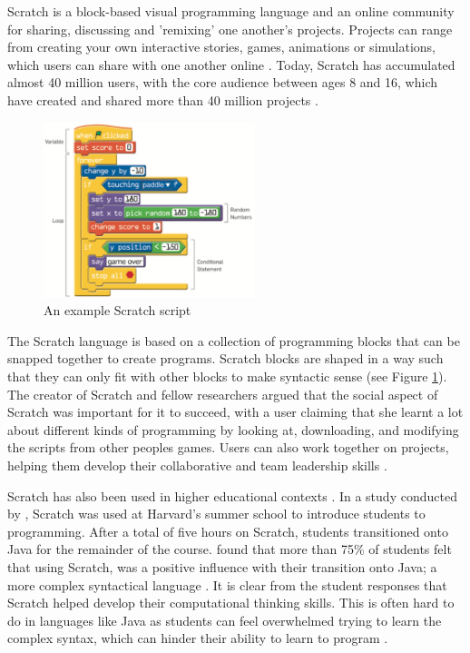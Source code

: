 \documentclass[a4paper,11.5pt]{report}
\numberwithin{figure}{section}
\numberwithin{table}{section}
\numberwithin{equation}{section}
\numberwithin{equation}{section}
\begin{document}
Scratch is a block-based visual programming language and an online community for sharing, discussing and 'remixing' one another's projects. Projects can range from creating your own interactive stories, games, animations or simulations, which users can share with one another online \citep{resnick2009}. Today, Scratch has accumulated almost 40 million users, with the core audience between ages 8 and 16, which have created and shared more than 40 million projects \citep{scratchstats}.

\begin{figure}
    \includegraphics[width=0.55\textwidth,]{Scratch-Example}
       \captionsetup{justification=centering}
\caption{An example Scratch script  {\citep{resnick2009}}}
\label{fig:Scratch-Example}
\end{figure}

The Scratch language is based on a collection of programming blocks that can be snapped together to create programs. Scratch blocks are shaped in a way such that they can only fit with other blocks  to make syntactic sense (see Figure \ref{fig:Scratch-Example}). The creator of Scratch and fellow researchers argued that the social aspect of Scratch was important for it to succeed, with a user claiming that she learnt a lot about different kinds of programming by looking at, downloading, and modifying the scripts from other peoples games. Users can also work together on projects, helping them develop their collaborative and team leadership skills \citep{resnick2009}.



Scratch has also been used in higher educational contexts \citep{resnick2009}. In a study conducted by \citet{malan2007}, Scratch was used at Harvard's summer school to introduce students to programming. After a total of five hours on Scratch, students transitioned onto Java for the remainder of the course. \citeauthor{malan2007} found that more than 75\% of students felt that using Scratch, was a positive influence with their transition onto Java; a more complex syntactical language \citep{malan2007}. It is clear from the student responses that Scratch helped develop their computational thinking skills. This is often hard to do in languages like Java as students can feel overwhelmed trying to learn the complex syntax, which can hinder their ability to learn to program \citep{Koulouri2014}.
\end{document}
